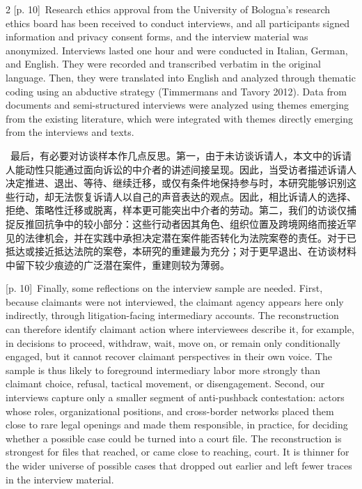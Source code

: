 \documentclass[10pt,a4paper]{article}
\begin{document}
\begin{paracol}{2}
\switchcolumn
{\scriptsize\color{gray} [p. 10]}\ Research ethics approval from the University of Bologna’s research ethics board has been received to conduct interviews, and all participants signed information and privacy consent forms, and the interview material was anonymized. Interviews lasted one hour and were conducted in Italian, German, and English. They were recorded and transcribed verbatim in the original language. Then, they were translated into English and analyzed through thematic coding using an abductive strategy (Timmermans and Tavory 2012). Data from documents and semi-structured interviews were analyzed using themes emerging from the existing literature, which were integrated with themes directly emerging from the interviews and texts.\par
\switchcolumn*
{\scriptsize\color{gray} [p. 10]}\ 最后，有必要对访谈样本作几点反思。第一，由于未访谈诉请人，本文中的诉请人能动性只能通过面向诉讼的中介者的讲述间接呈现。因此，当受访者描述诉请人决定推进、退出、等待、继续迁移，或仅有条件地保持参与时，本研究能够识别这些行动，却无法恢复诉请人以自己的声音表达的观点。因此，相比诉请人的选择、拒绝、策略性迁移或脱离，样本更可能突出中介者的劳动。第二，我们的访谈仅捕捉反推回抗争中的较小部分：这些行动者因其角色、组织位置及跨境网络而接近罕见的法律机会，并在实践中承担决定潜在案件能否转化为法院案卷的责任。对于已抵达或接近抵达法院的案卷，本研究的重建最为充分；对于更早退出、在访谈材料中留下较少痕迹的广泛潜在案件，重建则较为薄弱。\par
\switchcolumn
{\scriptsize\color{gray} [p. 10]}\ Finally, some reflections on the interview sample are needed. First, because claimants were not interviewed, the claimant agency appears here only indirectly, through litigation-facing intermediary accounts. The reconstruction can therefore identify claimant action where interviewees describe it, for example, in decisions to proceed, withdraw, wait, move on, or remain only conditionally engaged, but it cannot recover claimant perspectives in their own voice. The sample is thus likely to foreground intermediary labor more strongly than claimant choice, refusal, tactical movement, or disengagement. Second, our interviews capture only a smaller segment of anti-pushback contestation: actors whose roles, organizational positions, and cross-border networks placed them close to rare legal openings and made them responsible, in practice, for deciding whether a possible case could be turned into a court file. The reconstruction is strongest for files that reached, or came close to reaching, court. It is thinner for the wider universe of possible cases that dropped out earlier and left fewer traces in the interview material.\par
\switchcolumn*
\end{paracol}
\end{document}
